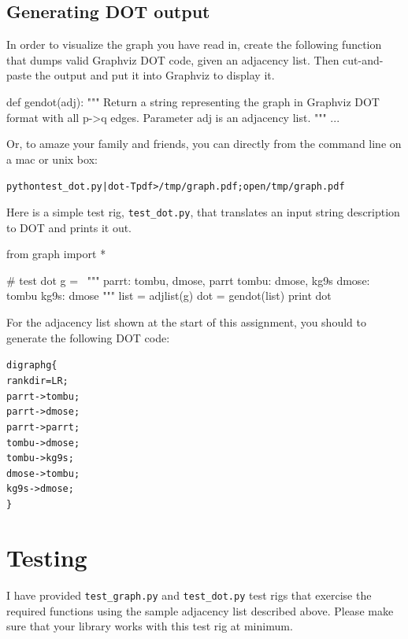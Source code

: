 \begin{fullwidth}
\subsection{Generating DOT output}

In order to visualize the graph you have read in, create the following function that dumps valid Graphviz DOT code, given an adjacency list. Then cut-and-paste the output and put it into Graphviz to display it.
 
\begin{pyverbatim}
def gendot(adj):
    """
    Return a string representing the graph in Graphviz DOT format
    with all p->q edges. Parameter adj is an adjacency list.
    """
    ...
\end{pyverbatim}

\noindent Or, to amaze your family and friends, you can directly from the command line on a mac or unix box:

\begin{alltt}
python test_dot.py | dot -Tpdf > /tmp/graph.pdf; open /tmp/graph.pdf
\end{alltt}

Here is a simple test rig, {\tt test\_dot.py}, that translates an input string description to DOT and prints it out.

\begin{pyverbatim}
from graph import *

# test dot
g = \
"""
parrt: tombu, dmose, parrt
tombu: dmose, kg9s
dmose: tombu
kg9s: dmose
"""
list = adjlist(g)
dot = gendot(list)
print dot
\end{pyverbatim}

\noindent For the adjacency list shown at the start of this assignment, you should to generate the following DOT code:

\begin{alltt}\small
digraph g \{
  rankdir=LR;
  parrt -> tombu;
  parrt -> dmose;
  parrt -> parrt;
  tombu -> dmose;
  tombu -> kg9s;
  dmose -> tombu;
  kg9s -> dmose;
\}
\end{alltt}

\section{Testing}

I have provided {\tt test\_graph.py} and {\tt test\_dot.py}  test rigs that exercise the required functions using the sample adjacency list described above. Please make sure that your library works with this test rig at minimum.


\end{fullwidth}
